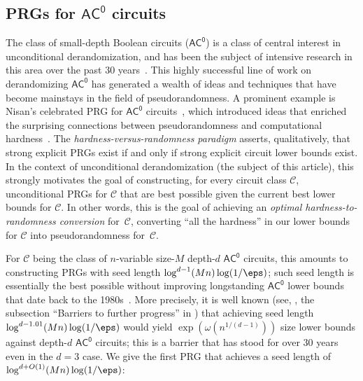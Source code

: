 \documentclass{toc}
\theoremstyle{plain}
\newcommand{\acz}{\mathsf{AC^0}}
\begin{document}
\subsection{PRGs for $\acz$ circuits} \label{sec:acz}

 
The class of small-depth Boolean circuits ($\acz$) is a class of central interest in unconditional derandomization, and has been the subject of  intensive research in this area over the past 30 years~\cite{AjtaiWigderson:85,LinialNisan:90,Nis91,NW94,LVW93,LV96,Kli01,Trevisan:04,Vio06,Baz09,Raz09,Bra10,KLW10,DETT10,Aaronson10,Aaronson10b,SimaZak10,LS11,FSUV12,GMRTV12,GMR13,TX13,GW14,Tal:15tightbounds,HS16journal,CHHL18journal}. 
This highly successful line of work on derandomizing $\acz$ has generated a wealth of ideas and techniques that have become mainstays in the field of pseudorandomness. A prominent example is Nisan's celebrated PRG for $\acz$ circuits~\cite{Nis91}, which introduced ideas that enriched the surprising connections between pseudorandomness and computational hardness~\cite{blumic82,Yao:82,NW94}.  The \emph{hardness-versus-randomness paradigm} asserts, qualitatively, that strong explicit PRGs exist if and only if strong explicit circuit lower bounds exist.  In the context of unconditional derandomization (the subject of
this %
article),  %
this strongly motivates the goal of constructing, for every 
circuit class $\mathscr{C}$,
%
%
unconditional PRGs for $\mathscr{C}$ that are best possible given the current best lower bounds for $\mathscr{C}$. In other words, this is the goal of achieving %
%
an \emph{optimal  %
%
hardness-to-randomness conversion}   %
for~$\mathscr{C}$, converting ``all the %
hardness''   %
in our lower bounds for $\mathscr{C}$ into pseudorandomness for~$\mathscr{C}$.

For $\mathscr{C}$ being the class of $n$-variable size-$M$ depth-$d$ $\acz$ circuits, %
this amounts to constructing PRGs with seed length 
$\log^{d-1}(Mn)\log(1/\eps)$; %
such seed length is essentially the best possible without improving longstanding $\acz$ lower bounds that date back to the 1980s~\cite{Hastad86}. More precisely, it is well known (see, \eg, the subsection ``Barriers to further progress'' in 
%
 \cite[Section 1]{TX13}) %
that achieving seed length $\log^{d-1.01}(Mn)\log(1/\eps)$ would yield $\exp(\omega(n^{1/(d-1)}))$ %
size lower bounds against depth-$d$ $\acz$ circuits; this is a barrier that has stood for over 30 years even in the $d=3$ case.  We give the first PRG that achieves a seed length of $\log^{d+O(1)}(Mn)\log(1/\eps)$: %
\end{document}
